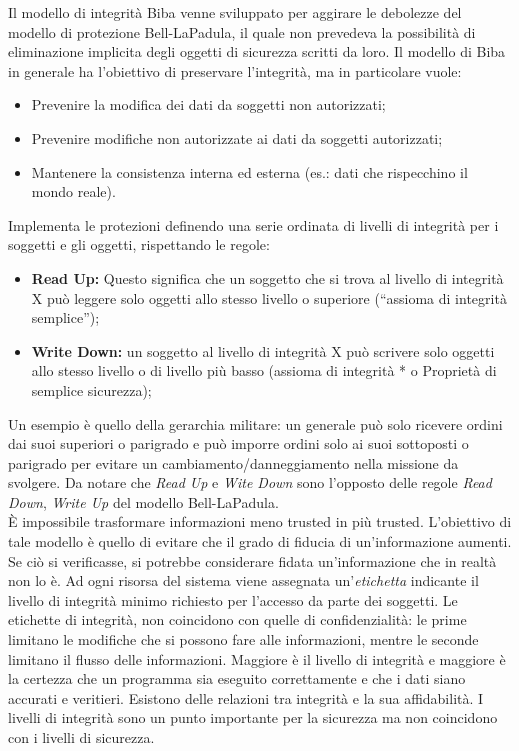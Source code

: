 Il modello di integrità Biba venne sviluppato per aggirare le debolezze del
modello di protezione
Bell-LaPadula, il quale non prevedeva la possibilità di eliminazione implicita
degli oggetti di
sicurezza scritti da loro.
Il modello di Biba in generale ha l’obiettivo di preservare l'integrità, ma in
particolare vuole:

\begin{itemize}
      \item Prevenire la modifica dei dati da soggetti non autorizzati;
      \item Prevenire modifiche non autorizzate ai dati da soggetti autorizzati;
      \item Mantenere la consistenza interna ed esterna (es.: dati che
            rispecchino il mondo reale).
\end{itemize}

Implementa le protezioni definendo una serie ordinata di livelli di integrità
per i soggetti e gli
oggetti, rispettando le regole:

\begin{itemize}
      \item \textbf{Read Up:} Questo significa che
            un soggetto che si trova al livello di integrità X può leggere
            solo oggetti allo stesso livello o
            superiore (“assioma di integrità semplice”);
      \item \textbf{Write Down:} un soggetto al livello di integrità X può
            scrivere solo oggetti allo stesso livello
            o di livello più basso (assioma di integrità * o Proprietà di
            semplice sicurezza);
\end{itemize}
Un esempio è quello della gerarchia militare: un generale può solo ricevere
ordini dai suoi superiori o parigrado e può imporre ordini solo ai suoi
sottoposti o parigrado per evitare un cambiamento/danneggiamento
nella missione da svolgere.
Da notare che \textit{Read Up} e \textit{Wite Down} sono l'opposto delle regole
\textit{Read Down}, \textit{Write Up} del modello Bell-LaPadula.\\

È impossibile trasformare informazioni meno trusted in più trusted.
L’obiettivo di tale modello è quello di evitare che il grado di fiducia di
un’informazione aumenti. Se ciò
si verificasse, si potrebbe considerare fidata un’informazione che in realtà
non lo è.
Ad ogni risorsa del sistema viene assegnata un’\textit{etichetta} indicante
il livello di integrità minimo
richiesto per l’accesso da parte dei soggetti. Le etichette di integrità,
non coincidono con quelle di
confidenzialità: le prime limitano le modifiche che si possono fare alle
informazioni, mentre le
seconde limitano il flusso delle informazioni. Maggiore è il livello di
integrità e maggiore è la
certezza che un programma sia eseguito correttamente e che i dati siano accurati
e veritieri.
Esistono delle relazioni tra integrità e la sua affidabilità. I livelli di
integrità sono un punto
importante per la sicurezza ma non coincidono con i livelli di sicurezza.\\

